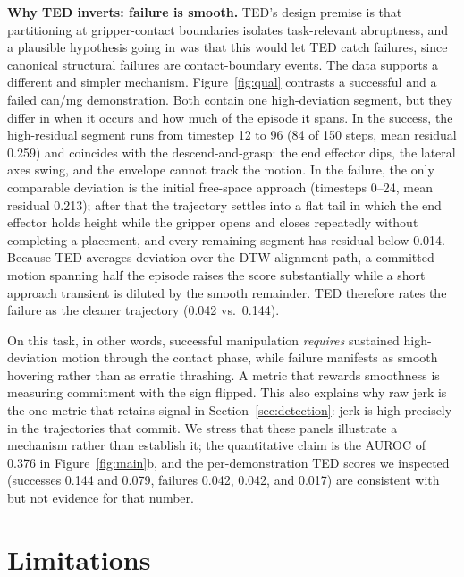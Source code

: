 \documentclass[10pt]{article}
\begin{document}
\textbf{Why TED inverts: failure is smooth.} TED's design premise is that
partitioning at gripper-contact boundaries isolates task-relevant
abruptness, and a plausible hypothesis going in was that this would let TED
catch failures, since canonical structural failures are contact-boundary
events. The data supports a different and simpler mechanism.
Figure~\ref{fig:qual} contrasts a successful and a failed can/mg
demonstration. Both contain one high-deviation segment, but they differ in
when it occurs and how much of the episode it spans. In the success, the
high-residual segment runs from timestep 12 to 96 (84 of 150 steps, mean
residual 0.259) and coincides with the descend-and-grasp: the end effector
dips, the lateral axes swing, and the envelope cannot track the motion. In
the failure, the only comparable deviation is the initial free-space
approach (timesteps 0--24, mean residual 0.213); after that the trajectory
settles into a flat tail in which the end effector holds height while the
gripper opens and closes repeatedly without completing a placement, and
every remaining segment has residual below 0.014. Because TED averages
deviation over the DTW alignment path, a committed motion spanning half the
episode raises the score substantially while a short approach transient is
diluted by the smooth remainder. TED therefore rates the failure as the
cleaner trajectory (0.042 vs.\ 0.144).

On this task, in other words, successful manipulation \emph{requires}
sustained high-deviation motion through the contact phase, while failure
manifests as smooth hovering rather than as erratic thrashing. A metric that
rewards smoothness is measuring commitment with the sign flipped. This also
explains why raw jerk is the one metric that retains signal in
Section~\ref{sec:detection}: jerk is high precisely in the trajectories that
commit. We stress that these panels illustrate a mechanism rather than
establish it; the quantitative claim is the AUROC of 0.376 in
Figure~\ref{fig:main}b, and the per-demonstration TED scores we inspected
(successes 0.144 and 0.079, failures 0.042, 0.042, and 0.017) are
consistent with but not evidence for that number.

\section{Limitations}
\label{sec:limitations}
\end{document}
